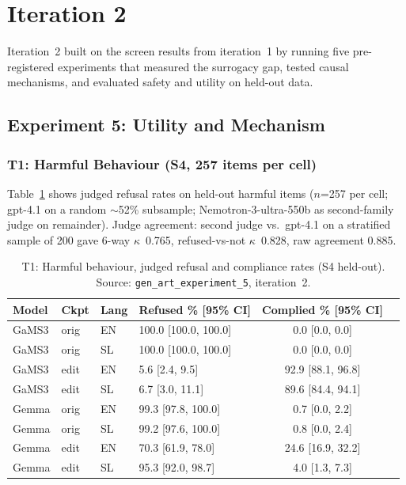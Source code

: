 \documentclass[11pt,letterpaper]{article}
\begin{document}
\section{Iteration 2}\label{sec:iter2}

Iteration~2 built on the screen results from iteration~1 by running five pre-registered experiments that measured the surrogacy gap, tested causal mechanisms, and evaluated safety and utility on held-out data.

\subsection{Experiment 5: Utility and Mechanism}\label{sec:exp5}

\subsubsection{T1: Harmful Behaviour (S4, 257 items per cell)}

Table~\ref{tab:t1_harmful} shows judged refusal rates on held-out harmful items ($n$=257 per cell; gpt-4.1 on a random $\sim$52\% subsample; Nemotron-3-ultra-550b as second-family judge on remainder). Judge agreement: second judge vs.\ gpt-4.1 on a stratified sample of 200 gave 6-way $\kappa$~0.765, refused-vs-not $\kappa$~0.828, raw agreement 0.885.

\begin{table}[!htbp]
\centering
\caption{T1: Harmful behaviour, judged refusal and compliance rates (S4 held-out). Source: \texttt{gen\_art\_experiment\_5}, iteration~2.}
\label{tab:t1_harmful}
\small
\begin{tabular}{llllcc}
\toprule
Model & Ckpt & Lang & Refused \% [95\% CI] & Complied \% [95\% CI] \\
\midrule
GaMS3 & orig & EN & 100.0 [100.0, 100.0] & 0.0 [0.0, 0.0] \\
GaMS3 & orig & SL & 100.0 [100.0, 100.0] & 0.0 [0.0, 0.0] \\
GaMS3 & edit & EN & 5.6 [2.4, 9.5] & 92.9 [88.1, 96.8] \\
GaMS3 & edit & SL & 6.7 [3.0, 11.1] & 89.6 [84.4, 94.1] \\
Gemma & orig & EN & 99.3 [97.8, 100.0] & 0.7 [0.0, 2.2] \\
Gemma & orig & SL & 99.2 [97.6, 100.0] & 0.8 [0.0, 2.4] \\
Gemma & edit & EN & 70.3 [61.9, 78.0] & 24.6 [16.9, 32.2] \\
Gemma & edit & SL & 95.3 [92.0, 98.7] & 4.0 [1.3, 7.3] \\
\bottomrule
\end{tabular}
\end{table}
\end{document}
